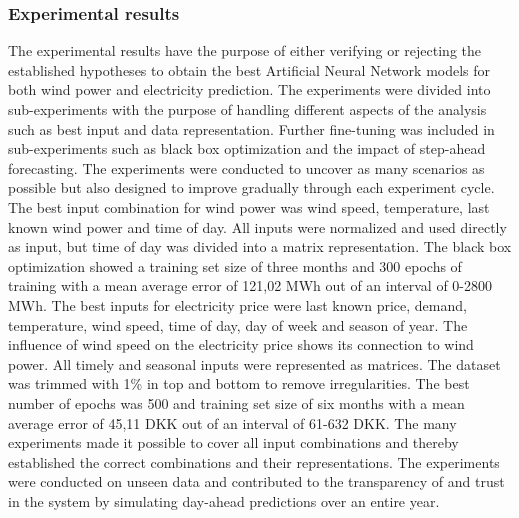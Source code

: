 \subsubsection{Experimental results}
The experimental results have the purpose of either verifying or rejecting the established hypotheses to obtain the best Artificial Neural Network models for both wind power and electricity prediction. The experiments were divided into sub-experiments with the purpose of handling different aspects of the analysis such as best input and data representation. Further fine-tuning was included in sub-experiments such as black box optimization and the impact of step-ahead forecasting. The experiments were conducted to uncover as many scenarios as possible but also designed to improve gradually through each experiment cycle. The best input combination for wind power was wind speed, temperature, last known wind power and time of day. All inputs were normalized and used directly as input, but time of day was divided into a matrix representation. The black box optimization showed a training set size of three months and 300 epochs of training with a mean average error of 121,02 MWh out of an interval of 0-2800 MWh. The best inputs for electricity price were last known price, demand, temperature, wind speed, time of day, day of week and season of year. The influence of wind speed on the electricity price shows its connection to wind power. All timely and seasonal inputs were represented as matrices. The dataset was trimmed with 1\% in top and bottom to remove irregularities. The best number of epochs was 500 and training set size of six months with a mean average error of 45,11 DKK out of an interval of 61-632 DKK. The many experiments made it possible to cover all input combinations and thereby established the correct combinations and their representations. The experiments were conducted on unseen data and contributed to the transparency of and trust in the system by simulating day-ahead predictions over an entire year.

